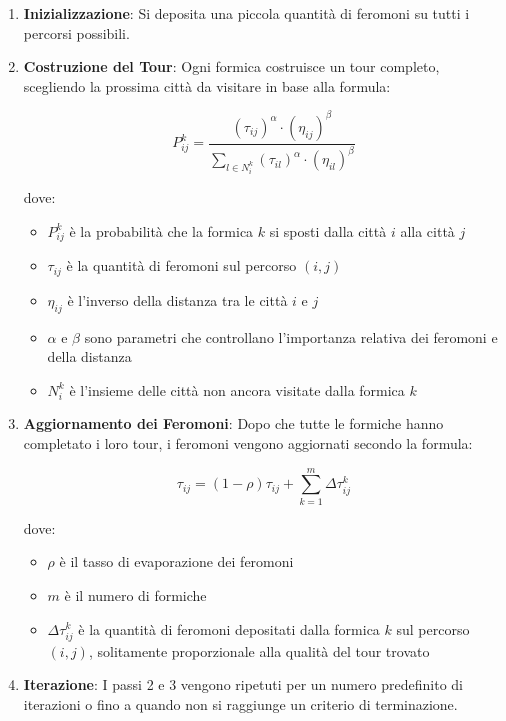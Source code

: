 \begin{enumerate}
	\item \textbf{Inizializzazione}: Si deposita una piccola quantità di feromoni su tutti i percorsi possibili.
	\item \textbf{Costruzione del Tour}: Ogni formica costruisce un tour completo, scegliendo la prossima città da visitare in base alla formula:

	      \[P_{ij}^k = \frac{(\tau_{ij})^\alpha \cdot (\eta_{ij})^\beta}{\sum_{l \in N_i^k} (\tau_{il})^\alpha \cdot (\eta_{il})^\beta}\]

	      dove:
	      \begin{itemize}
		      \item $P_{ij}^k$ è la probabilità che la formica $k$ si sposti dalla città $i$ alla città $j$
		      \item $\tau_{ij}$ è la quantità di feromoni sul percorso $(i,j)$
		      \item $\eta_{ij}$ è l'inverso della distanza tra le città $i$ e $j$
		      \item $\alpha$ e $\beta$ sono parametri che controllano l'importanza relativa dei feromoni e della distanza
		      \item $N_i^k$ è l'insieme delle città non ancora visitate dalla formica $k$
	      \end{itemize}

	\item \textbf{Aggiornamento dei Feromoni}: Dopo che tutte le formiche hanno completato i loro tour, i feromoni vengono aggiornati secondo la formula:

	      \[\tau_{ij} = (1-\rho)\tau_{ij} + \sum_{k=1}^m \Delta\tau_{ij}^k\]

	      dove:
	      \begin{itemize}
		      \item $\rho$ è il tasso di evaporazione dei feromoni
		      \item $m$ è il numero di formiche
		      \item $\Delta\tau_{ij}^k$ è la quantità di feromoni depositati dalla formica $k$ sul percorso $(i,j)$, solitamente proporzionale alla qualità del tour trovato
	      \end{itemize}

	\item \textbf{Iterazione}: I passi 2 e 3 vengono ripetuti per un numero predefinito di iterazioni o fino a quando non si raggiunge un criterio di terminazione.
\end{enumerate}

